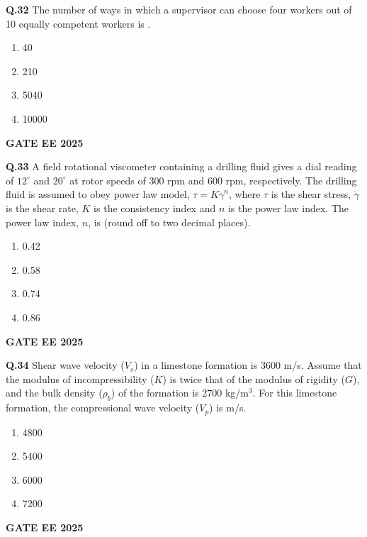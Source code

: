 \documentclass{article}
\begin{document}
\vspace{0.5cm}

\textbf{Q.32} The number of ways in which a supervisor can choose four workers out of 10 equally competent workers is \underline{\hspace{1cm}}.
\begin{enumerate}[label=(\Alph*)]
    \item 40
    \item 210
    \item 5040
    \item 10000
\end{enumerate}
\textbf{GATE EE 2025}

\vspace{0.5cm}

\textbf{Q.33} A field rotational viscometer containing a drilling fluid gives a dial reading of $12^\circ$ and $20^\circ$ at rotor speeds of 300 rpm and 600 rpm, respectively. The drilling fluid is assumed to obey power law model, $\tau = K \dot{\gamma}^n$, where $\tau$ is the shear stress, $\dot{\gamma}$ is the shear rate, $K$ is the consistency index and $n$ is the power law index. The power law index, $n$, is \underline{\hspace{1cm}} (round off to two decimal places).
\begin{enumerate}[label=(\Alph*)]
    \item 0.42
    \item 0.58
    \item 0.74
    \item 0.86
\end{enumerate}
\textbf{GATE EE 2025}

\vspace{0.5cm}

\textbf{Q.34} Shear wave velocity ($V_s$) in a limestone formation is 3600 m/s. Assume that the modulus of incompressibility ($K$) is twice that of the modulus of rigidity ($G$), and the bulk density ($\rho_b$) of the formation is 2700 kg/m$^3$. For this limestone formation, the compressional wave velocity ($V_p$) is \underline{\hspace{1cm}} m/s.
\begin{enumerate}[label=(\Alph*)]
    \item 4800
    \item 5400
    \item 6000
    \item 7200
\end{enumerate}
\textbf{GATE EE 2025}
\end{document}
